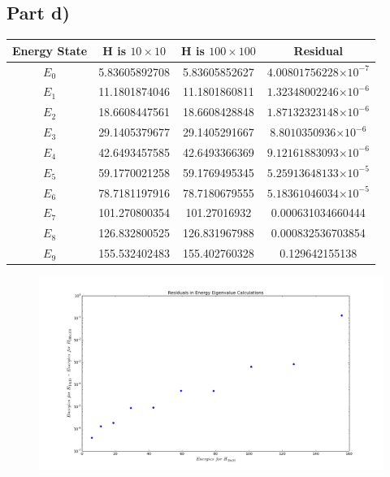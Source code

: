 \documentclass[a4paper,12pt]{article}
\providecommand{\e}[1]{\ensuremath{\times 10^{#1}}}
\begin{document}
\subsection{Part d)}

\begin{table}[!htbp]
  \centering
  \begin{tabular}{|c||c||c||c|}
  \hline
  Energy State & H is $10 \times 10$ & H is $100 \times 100$ & Residual\\
  \hline
  \hline
   $E_0$ & 5.83605892708 & 5.83605852627 & $4.00801756228\e{-7}$\\
	\hline
	 $E_1$ & 11.1801874046 & 11.1801860811 & $1.32348002246\e{-6}$\\
	\hline
	 $E_2$ & 18.6608447561 & 18.6608428848 & $1.87132323148\e{-6}$\\
	\hline
	 $E_3$ & 29.1405379677 & 29.1405291667 & $8.8010350936\e{-6}$\\
	\hline
	 $E_4$ & 42.6493457585 & 42.6493366369 & $9.12161883093\e{-6}$\\
	\hline
	 $E_5$ & 59.1770021258 & 59.1769495345 & $5.25913648133\e{-5}$\\
	\hline
	 $E_6$ & 78.7181197916 & 78.7180679555 & $5.18361046034\e{-5}$\\
	\hline
	 $E_7$ & 101.270800354 & 101.27016932 & 0.000631034660444\\
	\hline
	 $E_8$ & 126.832800525 & 126.831967988 & 0.000832536703854\\
	\hline
	 $E_9$ & 155.532402483 & 155.402760328 & 0.129642155138\\
	\hline
  \end{tabular}
\label{tab:energy}
\end{table}

\begin{figure}[H]
\centering
\includegraphics[width = \linewidth]{lab4q2d.png}
\caption{}
\label{fig:q2d}
\end{figure}
\end{document}

